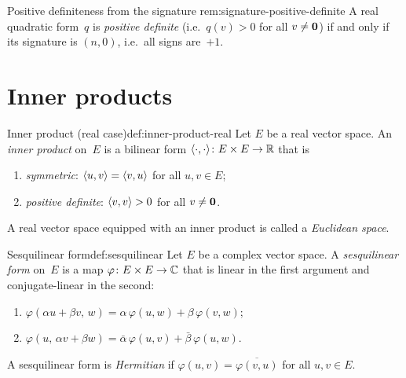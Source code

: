 \begin{remark}{Positive definiteness from the signature}%
{rem:signature-positive-definite}
A real quadratic form~$q$ is \emph{positive definite} (i.e.\ $q(v)>0$ for all $v\neq\mathbf{0}$) if and only if its
signature is $(n,0)$, i.e.\ all signs are~$+1$.
\end{remark}


\section{Inner products}\label{sec:inner-products}

\begin{definition}{Inner product (real case)}{def:inner-product-real}
Let $E$ be a real vector space.  An \emph{inner product} on~$E$ is a
bilinear form $\langle\cdot,\cdot\rangle\colon E\times E\to{\mathbb{R}}$ that is
\begin{enumerate}[label=(\roman*)]
  \item \emph{symmetric}: $\langle u,v\rangle = \langle v,u\rangle$ for all
    $u,v\in E$;
  \item \emph{positive definite}: $\langle v,v\rangle > 0$ for all
    $v\neq\mathbf{0}$.
\end{enumerate}
A real vector space equipped with an inner product is called a
\emph{Euclidean space}.
\end{definition}

\begin{definition}{Sesquilinear form}{def:sesquilinear}
Let $E$ be a complex vector space.  A \emph{sesquilinear form} on~$E$
is a map $\varphi\colon E\times E\to{\mathbb{C}}$ that is linear in the first
argument and conjugate-linear in the second:
\begin{enumerate}[label=(\roman*)]
  \item $\varphi(\alpha u + \beta v,\, w) = \alpha\,\varphi(u,w)
    + \beta\,\varphi(v,w)$;
  \item $\varphi(u,\, \alpha v + \beta w) = \bar{\alpha}\,\varphi(u,v)
    + \bar{\beta}\,\varphi(u,w)$.
\end{enumerate}
A sesquilinear form is \emph{Hermitian} if
$\varphi(u,v) = \overline{\varphi(v,u)}$ for all $u,v\in E$.
\end{definition}

